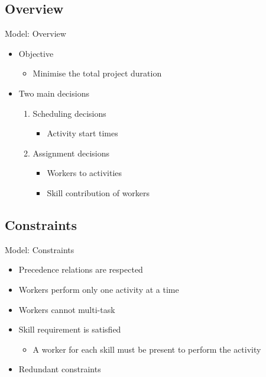 \documentclass{beamer}
\begin{document}
\subsection{Overview}
\begin{frame}{Model: Overview}
	\begin{itemize}
		\item \pause Objective\pause
		\begin{itemize}
			\item Minimise the total project duration\pause
		\end{itemize}
	\end{itemize}
	\vspace{5mm}
	\begin{itemize}
		\item Two main decisions\pause
		\vspace{2mm}
		\begin{enumerate}
			\item Scheduling decisions
			\begin{itemize}
				\item Activity start times\pause
			\end{itemize}
			\vspace{2mm}
			\item Assignment decisions
			\begin{itemize}
				\item Workers to activities
				\vspace{1mm}
				\item Skill contribution of workers
			\end{itemize}
		\end{enumerate}
	\end{itemize}
\end{frame}

\subsection{Constraints}
\begin{frame}{Model: Constraints}
	\begin{itemize}
		\item \pause Precedence relations are respected\pause
		\vspace{2mm}
		\item Workers perform only one activity at a time\pause
		\vspace{2mm}
		\item Workers cannot multi-task\pause
		\vspace{2mm}
		\item Skill requirement is satisfied
		\begin{itemize}
			\item A worker for each skill must be present to perform the activity\pause
		\end{itemize}
		\vspace{2mm}
		\item Redundant constraints
	\end{itemize}
\end{frame}
\end{document}
